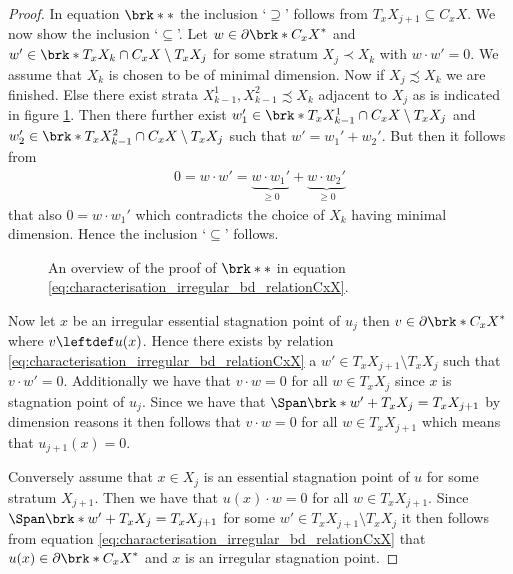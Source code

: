 \begin{proof}
  In equation $\brk*{*}$ 
  the inclusion `$\supseteq$' follows from $T_xX_{j+1}\subseteq C_xX$.
  We now show the
  inclusion `$\subseteq$'. Let $w\in \partial\brk*{C_xX}^*$ and $w'\in \brk*{T_xX_k\cap C_xX}\setminus T_xX_j$ for some stratum $X_j\prec X_k$ with $w\cdot w'=0$.
  We assume that $X_k$ is chosen to be of minimal dimension.
  Now if $X_j\precsim X_k$ we are finished. Else there exist strata $X_{k-1}^1,X_{k-1}^2\precsim X_k$
  adjacent to $X_j$ as is indicated in figure \ref{fi:irregularCPs_X123}. Then there further exist $w_1'\in \brk*{T_xX_{k-1}^1\cap C_xX}\setminus T_xX_j$ and $w_2'\in \brk*{T_xX_{k-1}^2\cap C_xX}\setminus T_xX_j$
  such that $w'=w_1'+w_2'$. But then it follows from
  \begin{align*}
    0=w\cdot w'=\underbrace{w\cdot w_1'}_{\geq0}+\underbrace{w\cdot w_2'}_{\geq0}
  \end{align*}
  that also $0=w\cdot w_1'$ which contradicts the choice of $X_k$ having minimal dimension.
  Hence the inclusion `$\subseteq$' follows.
  \begin{figure}
    \centering
    
    \caption{An overview of the proof of $\brk*{*}$ in equation \eqref{eq:characterisation_irregular_bd_relationCxX}.}
    \label{fi:irregularCPs_X123}
  \end{figure}

  Now let $x$ be an irregular essential stagnation point of $u_j$ then  $v\in \partial\brk*{C_xX}^*$ where $v\leftdef u(x)$. Hence there
  exists by relation \eqref{eq:characterisation_irregular_bd_relationCxX} a $w'\in T_xX_{j+1}\setminus T_xX_j$ such that $v\cdot w'=0$. 
  Additionally we have that $v\cdot w=0$ for all $w\in T_xX_j$ since $x$ is stagnation point of $u_j$.
  Since we have that
  $\Span\brk*{w'}+T_xX_j=T_xX_{j+1}$ by dimension reasons it then follows that
  $v\cdot w=0$ for all $w\in T_xX_{j+1}$ which means that $u_{j+1}(x)=0$.

  Conversely assume that $x\in X_j$ is an essential stagnation point of $u$ for some stratum $X_{j+1}$. Then we have that
  $u(x)\cdot w=0$ for all $w\in T_xX_{j+1}$. Since  $\Span\brk*{w'}+T_xX_j=T_xX_{j+1}$
  for some $w'\in T_xX_{j+1}\setminus T_xX_j$
  it then follows from equation \eqref{eq:characterisation_irregular_bd_relationCxX} that $u(x)\in \partial\brk*{C_xX}^*$
  and $x$ is an irregular stagnation point.
\end{proof}
